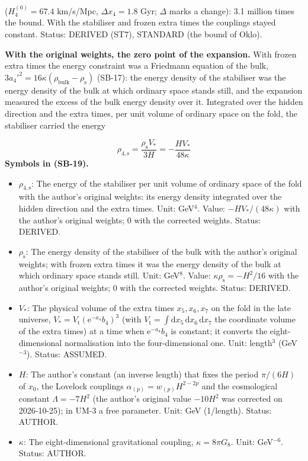\documentclass[
  10pt,
]{article}
\providecommand{\tightlist}{%
  \setlength{\itemsep}{0pt}\setlength{\parskip}{0pt}}
\begin{document}
(\(H_4^{(0)} = 67.4\) km/s/Mpc, \(\Delta x_4 = 1.8\) Gyr; \(\Delta\)
marks a change): 3.1 million times the bound. With the stabiliser and
frozen extra times the couplings stayed constant. Status: DERIVED (ST7),
STANDARD (the bound of Oklo).

\textbf{With the original weights, the zero point of the expansion.}
With frozen extra times the energy constraint was a Friedmann equation
of the bulk,
\(3a_4'^2 = 16\kappa(\rho_{\mathrm{bulk}} - \rho_{\mathrm{s}})\)
(SB-17): the energy density of the stabiliser was the energy density of
the bulk at which ordinary space stands still, and the expansion
measured the excess of the bulk energy density over it. Integrated over
the hidden direction and the extra times, per unit volume of ordinary
space on the fold, the stabiliser carried the energy

\[
\rho_{4,\mathrm{s}} = \frac{\rho_{\mathrm{s}}V_*}{3H} = -\frac{HV_*}{48\kappa} \tag{SB-19}
\] \textbf{Symbols in (SB-19).}

\begin{itemize}
\tightlist
\item
  \(\rho_{4,\mathrm{s}}\): The energy of the stabiliser per unit volume
  of ordinary space of the fold with the author's original weights: its
  energy density integrated over the hidden direction and the extra
  times. Unit: GeV\(^4\). Value: \(-HV_*/(48\kappa)\) with the author's
  original weights; 0 with the corrected weights. Status: DERIVED.
\item
  \(\rho_{\mathrm{s}}\): The energy density of the stabiliser of the
  bulk with the author's original weights; with frozen extra times it
  was the energy density of the bulk at which ordinary space stands
  still. Unit: GeV\(^8\). Value: \(\kappa\rho_{\mathrm{s}} = -H^2/16\)
  with the author's original weights; 0 with the corrected weights.
  Status: DERIVED.
\item
  \(V_*\): The physical volume of the extra times \(x_5, x_6, x_7\) on
  the fold in the late universe,
  \(V_* = V_{\mathrm{t}}(\mathrm{e}^{-a_4}b_4)^3\) (with
  \(V_{\mathrm{t}} = \int\mathrm{d}x_5\,\mathrm{d}x_6\,\mathrm{d}x_7\)
  the coordinate volume of the extra times) at a time when
  \(\mathrm{e}^{-a_4}b_4\) is constant; it converts the
  eight-dimensional normalisation into the four-dimensional one. Unit:
  length\(^3\) (GeV\(^{-3}\)). Status: ASSUMED.
\item
  \(H\): The author's constant (an inverse length) that fixes the period
  \(\pi/(6H)\) of \(x_0\), the Lovelock couplings
  \(\alpha_{(p)} = w_{(p)}H^{2-2p}\) and the cosmological constant
  \(\Lambda = -7H^2\) (the author's original value \(-10H^2\) was
  corrected on 2026-10-25); in UM-3 a free parameter. Unit: GeV
  (1/length). Status: AUTHOR.
\item
  \(\kappa\): The eight-dimensional gravitational coupling,
  \(\kappa = 8\pi G_8\). Unit: GeV\(^{-6}\). Status: AUTHOR.
\end{itemize}
\end{document}
